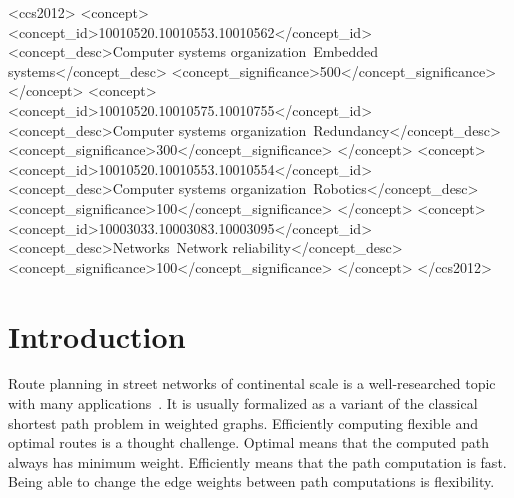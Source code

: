 \documentclass[sigconf]{acmart}
\begin{document}
\begin{CCSXML}
<ccs2012>
 <concept>
  <concept_id>10010520.10010553.10010562</concept_id>
  <concept_desc>Computer systems organization~Embedded systems</concept_desc>
  <concept_significance>500</concept_significance>
 </concept>
 <concept>
  <concept_id>10010520.10010575.10010755</concept_id>
  <concept_desc>Computer systems organization~Redundancy</concept_desc>
  <concept_significance>300</concept_significance>
 </concept>
 <concept>
  <concept_id>10010520.10010553.10010554</concept_id>
  <concept_desc>Computer systems organization~Robotics</concept_desc>
  <concept_significance>100</concept_significance>
 </concept>
 <concept>
  <concept_id>10003033.10003083.10003095</concept_id>
  <concept_desc>Networks~Network reliability</concept_desc>
  <concept_significance>100</concept_significance>
 </concept>
</ccs2012>
\end{CCSXML}




\maketitle

\section{Introduction}
\label{sec:intro}
Route planning in street networks of continental scale is a well-researched topic with many applications~\cite{bdgmpsww-rptn-16}.
It is usually formalized as a variant of the classical shortest path problem in weighted graphs.
Efficiently computing flexible and optimal routes is a thought challenge.
Optimal means that the computed path always has minimum weight.
Efficiently means that the path computation is fast.
Being able to change the edge weights between path computations is flexibility.
\end{document}
